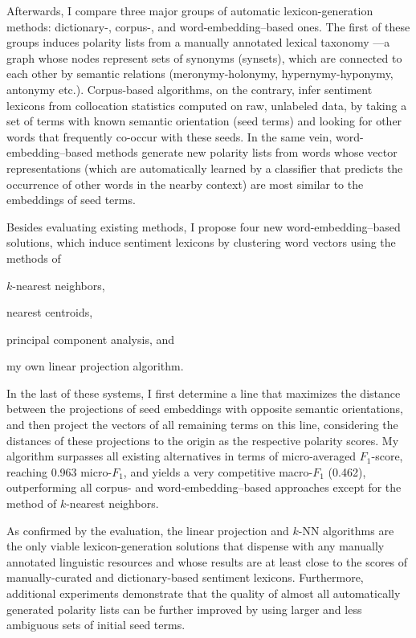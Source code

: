 \documentclass[11pt]{article}
\newcommand{\F}[0]{$F_1$}
\renewcommand{\cite}{\citep}
\begin{document}
Afterwards, I compare three major groups of automatic
lexicon-generation methods: dictionary-, corpus-, and
word-embedding--based ones.  The first of these groups induces
polarity lists from a manually annotated lexical taxonomy
\cite[\textsc{GermaNet}; ][]{Hamp:97}---a graph whose nodes represent
sets of synonyms (synsets), which are connected to each other by
semantic relations (meronymy-holonymy, hypernymy-hyponymy, antonymy
etc.).  Corpus-based algorithms, on the contrary, infer sentiment
lexicons from collocation statistics computed on raw, unlabeled data,
by taking a set of terms with known semantic orientation (seed terms)
and looking for other words that frequently co-occur with these seeds.
In the same vein, word-embedding--based methods generate new polarity
lists from words whose vector representations (which are automatically
learned by a classifier that predicts the occurrence of other words in
the nearby context) are most similar to the embeddings of seed terms.

Besides evaluating existing methods, I propose four new
word-embedding--based solutions, which induce sentiment lexicons by
clustering word vectors using the methods of
\begin{inparaenum}[(i)]
\item $k$-nearest neighbors,
\item nearest centroids,
\item principal component analysis, and
\item my own linear projection algorithm.
\end{inparaenum}
In the last of these systems, I first determine a line that maximizes
the distance between the projections of seed embeddings with opposite
semantic orientations, and then project the vectors of all remaining
terms on this line, considering the distances of these projections to
the origin as the respective polarity scores.  My algorithm surpasses
all existing alternatives in terms of micro-averaged \F{}-score,
reaching 0.963 micro-\F{}, and yields a very competitive macro-\F{}
(0.462), outperforming all corpus- and word-embedding--based
approaches except for the method of $k$-nearest neighbors.

As confirmed by the evaluation, the linear projection and $k$-NN
algorithms are the only viable lexicon-generation solutions that
dispense with any manually annotated linguistic resources and whose
results are at least close to the scores of manually-curated and
dictionary-based sentiment lexicons.  Furthermore, additional
experiments demonstrate that the quality of almost all automatically
generated polarity lists can be further improved by using larger and
less ambiguous sets of initial seed terms.
\end{document}
